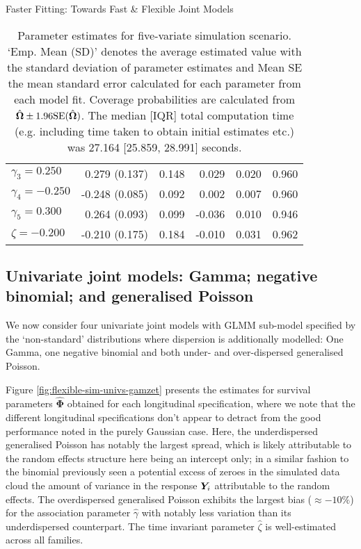 \begin{chapter}{\label{cha:flexible}Faster Fitting: Towards Fast \& Flexible Joint Models}
\begin{table}[ht]
\begin{tabular}{l|rrrrr}
  $\gamma_3= 0.250$ &  0.279 (0.137) & 0.148 &  0.029 & 0.020 & 0.960 \\ 
  $\gamma_4=-0.250$ & -0.248 (0.085) & 0.092 &  0.002 & 0.007 & 0.960 \\ 
  $\gamma_5= 0.300$ &  0.264 (0.093) & 0.099 & -0.036 & 0.010 & 0.946 \\ 
  $\zeta=-0.200$ & -0.210 (0.175) & 0.184 & -0.010 & 0.031 & 0.962 \\ 
   \hline
\end{tabular}
\caption{Parameter estimates for five-variate simulation scenario. `Emp. Mean (SD)' denotes the average estimated value with the standard deviation of parameter estimates and Mean SE the mean standard error calculated for each parameter from each model fit. Coverage probabilities are calculated from $\hat{\bm{\Omega}}\pm1.96\mathrm{SE}(\hat{\bm{\Omega}})$. The median [IQR] total computation time (e.g. including time taken to obtain initial estimates etc.) was 27.164 [25.859, 28.991] seconds.} 
\label{tab:flexible-fivevariate}
\end{table}

\subsection{Univariate joint models: Gamma; negative binomial; and generalised Poisson}\label{sec:flexible-sim-univs}
We now consider four univariate joint models with GLMM sub-model specified by the `non-standard' distributions where dispersion is additionally modelled: One Gamma, one negative binomial and both under- and over-dispersed generalised Poisson.

Figure \ref{fig:flexible-sim-univs-gamzet} presents the estimates for survival parameters $\hat{\bm{\Phi}}$ obtained for each longitudinal specification, where we note that the different longitudinal specifications don't appear to detract from the good performance noted in the purely Gaussian case. Here, the underdispersed generalised Poisson has notably the largest spread, which is likely attributable to the random effects structure here being an intercept only; in a similar fashion to the binomial previously seen a potential excess of zeroes in the simulated data cloud the amount of variance in the response $\bm{Y}_i$ attributable to the random effects. The overdispersed generalised Poisson exhibits the largest bias ($\approx-10\%$) for the association parameter $\hat{\gamma}$ with notably less variation than its underdispersed counterpart. The time invariant parameter $\hat{\zeta}$ is well-estimated across all families. 


\end{chapter}

